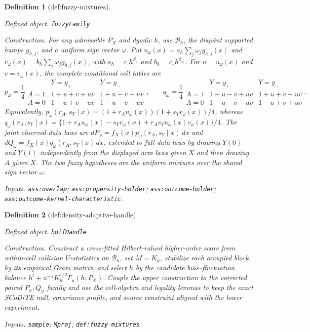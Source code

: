 \documentclass{article}
\newtheorem{definition}{Definition}
\begin{document}
\begin{definition}[def:fuzzy-mixtures]\label{def:fuzzy-mixtures}
\par\smallskip\noindent\emph{Defined object.} \texttt{fuzzyFamily}
\par\smallskip\noindent\emph{Construction.} For any admissible \(P_X\) and dyadic \(h\), use \(\mathcal B_h\), the disjoint supported bumps \(g_{h,j}\), and a uniform sign vector \(\omega\). Put \(u_\omega(x)=a_h\sum_j\omega_jg_{h,j}(x)\) and \(v_\omega(x)=b_h\sum_j\omega_jg_{h,j}(x)\), with \(a_h=c_\circ h^{\beta_e}\) and \(b_h=c_\circ h^{\beta_m}\). For \(u=u_\omega(x)\) and \(v=v_\omega(x)\), the complete conditional cell tables are \[p_\omega=\frac14\begin{array}{c|cc}&Y=y_+&Y=y_-\\\hline A=1&1+u+v+uv&1+u-v-uv\\A=0&1-u+v-uv&1-u-v+uv\end{array},\qquad q_\omega=\frac14\begin{array}{c|cc}&Y=y_+&Y=y_-\\\hline A=1&1+u-v+uv&1+u+v-uv\\A=0&1-u-v-uv&1-u+v+uv\end{array}.\] Equivalently, \(p_\omega(r_A,s_Y\mid x)=(1+r_Au_\omega(x))(1+s_Yv_\omega(x))/4\), whereas \(q_\omega(r_A,s_Y\mid x)=\{1+r_Au_\omega(x)-s_Yv_\omega(x)+r_As_Yu_\omega(x)v_\omega(x)\}/4\). The joint observed-data laws are \(dP_\omega=f_X(x)p_\omega(r_A,s_Y\mid x)\,dx\) and \(dQ_\omega=f_X(x)q_\omega(r_A,s_Y\mid x)\,dx\), extended to full-data laws by drawing \(Y(0)\) and \(Y(1)\) independently from the displayed arm laws given \(X\) and then drawing \(A\) given \(X\). The two fuzzy hypotheses are the uniform mixtures over the shared sign vector \(\omega\).
\par\smallskip\noindent\emph{Inputs.} \texttt{ass:\allowbreak{}overlap}; \texttt{ass:\allowbreak{}propensity-\allowbreak{}holder}; \texttt{ass:\allowbreak{}outcome-\allowbreak{}holder}; \texttt{ass:\allowbreak{}outcome-\allowbreak{}kernel-\allowbreak{}characteristic}.
\end{definition}

\begin{definition}[def:density-adaptive-handle]\label{def:density-adaptive-handle}
\par\smallskip\noindent\emph{Defined object.} \texttt{hoifHandle}
\par\smallskip\noindent\emph{Construction.} Construct a cross-fitted Hilbert-valued higher-order score from within-cell collision \(U\)-statistics on \(\mathcal B_h\), set \(M=K_h\), stabilize each occupied block by its empirical Gram matrix, and select \(h\) by the candidate bias--fluctuation balance \(h^t+n^{-1}K_h^{1/2}\Gamma_n(h;P_X)\). Couple the upper construction to the corrected paired \(P_\omega,Q_\omega\) family and use the cell-algebra and legality lemmas to keep the exact SCoDiTE null, covariance profile, and source constraint aligned with the lower experiment.
\par\smallskip\noindent\emph{Inputs.} \texttt{sample}; \texttt{Mproj}; \texttt{def:\allowbreak{}fuzzy-\allowbreak{}mixtures}.
\end{definition}
\end{document}
